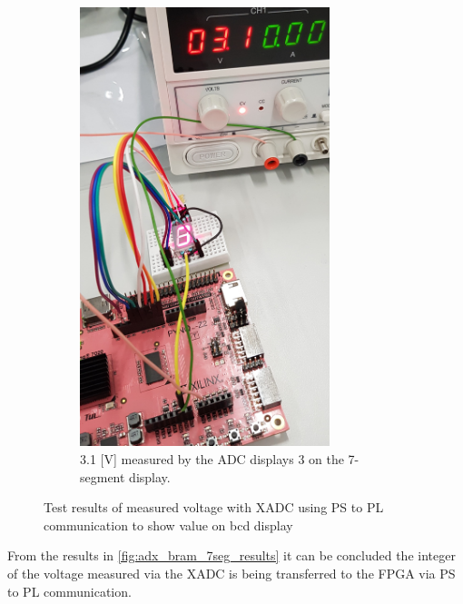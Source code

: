\documentclass[../report.tex]{subfiles}
\begin{document}
\begin{figure}[H]
\begin{subfigure}[t]{0.45\textwidth}
        \includegraphics[width=0.8\textwidth]{figures/xadc/3V_result.jpg}
        \captionsetup{width=0.8\textwidth}
        \caption{3.1 [V] measured by the ADC displays 3 on the 7-segment display.}     
        \label{}
    \end{subfigure}
    \caption{Test results of measured voltage with XADC using PS to PL communication to show value on bcd display} 
    \label{fig:adx_bram_7seg_results}
\end{figure}

From the results in \autoref{fig:adx_bram_7seg_results} it can be concluded the integer of the voltage measured via the XADC is being transferred to the FPGA via PS to PL communication.
\end{document}
